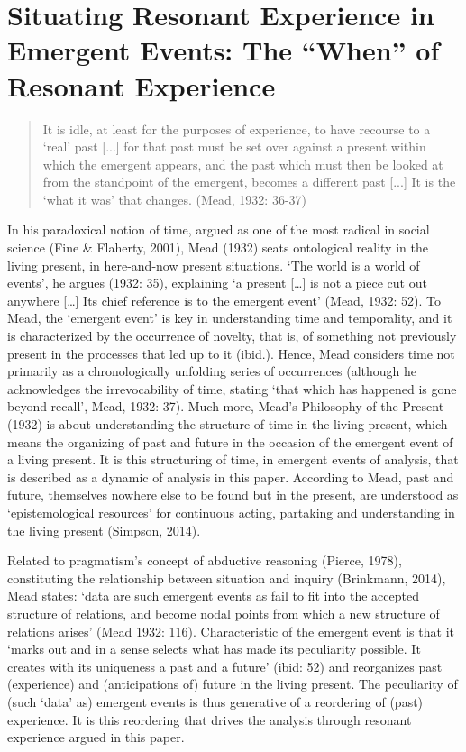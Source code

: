\section{Situating Resonant Experience in Emergent Events: The \enquote{When} of Resonant Experience}
    \blockquote{It is idle, at least for the purposes of experience, to have recourse to a ‘real’ past [...] for that past must be set over against a present within which the emergent appears, and the past which must then be looked at from the standpoint of the emergent, becomes a different past [...] It is the ‘what it was’ that changes. (Mead, 1932: 36-37)}
In his paradoxical notion of time, argued as one of the most radical in social science (Fine \& Flaherty, 2001), Mead (1932) seats ontological reality in the living present, in here-and-now present situations. ‘The world is a world of events’, he argues (1932: 35), explaining ‘a present […] is not a piece cut out anywhere […] Its chief reference is to the emergent event’ (Mead, 1932: 52). To Mead, the ‘emergent event’ is key in understanding time and temporality, and it is characterized by the occurrence of novelty, that is, of something not previously present in the processes that led up to it (ibid.). Hence, Mead considers time not primarily as a chronologically unfolding series of occurrences (although he acknowledges the irrevocability of time, stating ‘that which has happened is gone beyond recall’, Mead, 1932: 37). Much more, Mead’s Philosophy of the Present (1932) is about understanding the structure of time in the living present, which means the organizing of past and future in the occasion of the emergent event of a living present. It is this structuring of time, in emergent events of analysis, that is described as a dynamic of analysis in this paper. According to Mead, past and future, themselves nowhere else to be found but in the present, are understood as ‘epistemological resources’ for continuous acting, partaking and understanding in the living present (Simpson, 2014).

Related to pragmatism’s concept of abductive reasoning (Pierce, 1978), constituting the relationship between situation and inquiry (Brinkmann, 2014), Mead states: ‘data are such emergent events as fail to fit into the accepted structure of relations, and become nodal points from which a new structure of relations arises’ (Mead 1932: 116). Characteristic of the emergent event is that it ‘marks out and in a sense selects what has made its peculiarity possible. It creates with its uniqueness a past and a future’ (ibid: 52) and reorganizes past (experience) and (anticipations of) future in the living present. The peculiarity of (such ‘data’ as) emergent events is thus generative of a reordering of (past) experience. It is this reordering that drives the analysis through resonant experience argued in this paper. 


